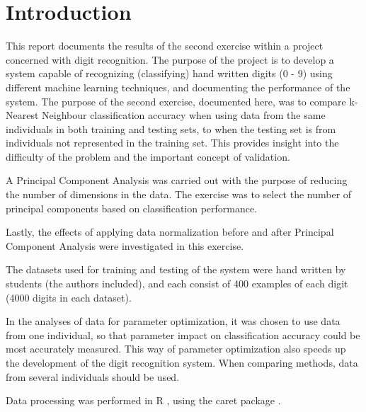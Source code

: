 \section{Introduction}
\label{sec:introduction}
This report documents the results of the second exercise within
a project concerned with digit recognition.
The purpose of the project is to develop a system capable of recognizing
(classifying) hand written digits (0 - 9) using different machine learning techniques,
and documenting the performance of the system.
The purpose of the second exercise, documented here, was to
compare k-Nearest Neighbour classification accuracy when using
data from the same individuals in both training and testing sets,
to when the testing set is from individuals not represented in the training set.
This provides insight into the difficulty of the problem and the important
concept of validation.

A Principal Component Analysis was carried out with the purpose
of reducing the number of dimensions in the data.
The exercise was to select the number of principal components
based on classification performance.

Lastly, the effects of applying data normalization before and after
Principal Component Analysis were investigated in this exercise.

The datasets used for training and testing of the system
were hand written by students (the authors included), and each
consist of 400 examples of each digit (4000 digits in each dataset).

In the analyses of data for parameter optimization,
it was chosen to use data from one individual,
so that parameter impact on classification accuracy
could be most accurately measured. This way of parameter
optimization also speeds up the development of the digit recognition system.
When comparing methods, data from several individuals should be used.

Data processing was performed in R \citep{R}, using the caret package \citep{caret}.

%
